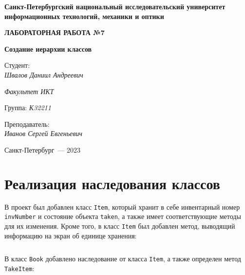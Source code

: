 \documentclass[a4paper,14pt]{extarticle}
\numberwithin{figure}{section}
\begin{document}
\begin{titlepage}
    \vspace{0pt plus2fill}
    \noindent

    \vspace{0pt plus6fill}
    \begin{center}
        \textbf{\large{Санкт-Петербургский национальный исследовательский университет информационных
                технологий, механики и оптики}}

        \vspace{0pt plus2fill}
        \textbf{\Large{ЛАБОРАТОРНАЯ РАБОТА №7}}

        \vspace{0pt plus2fill}
        \textbf{\large{Создание иерархии классов}}
    \end{center}

    \vspace{0pt plus8fill}
    \begin{flushright}
        Студент: \\
        \textit{Швалов Даниил Андреевич}

        \textit{Факультет ИКТ}

        Группа: \textit{К32211}

        Преподаватель: \\
        \textit{Иванов Сергей Евгеньевич}
    \end{flushright}

    \vspace{0pt plus4fill}
    \begin{center}
        {Санкт-Петербург~--- 2023}
    \end{center}
\end{titlepage}

\section{Реализация наследования классов}

В проект был добавлен класс \texttt{Item}, который хранит в себе инвентарный номер \texttt{invNumber} и состояние объекта \texttt{taken}, а также имеет соответствующие методы для их изменения. Кроме того, в класс \texttt{Item} был добавлен метод, выводящий информацию на экран об единице хранения:

\inputminted{csharp}{../MyClass/MyClass/Item.cs}

В класс \texttt{Book} добавлено наследование от класса \texttt{Item}, а также определен метод \texttt{TakeItem}:
\end{document}
